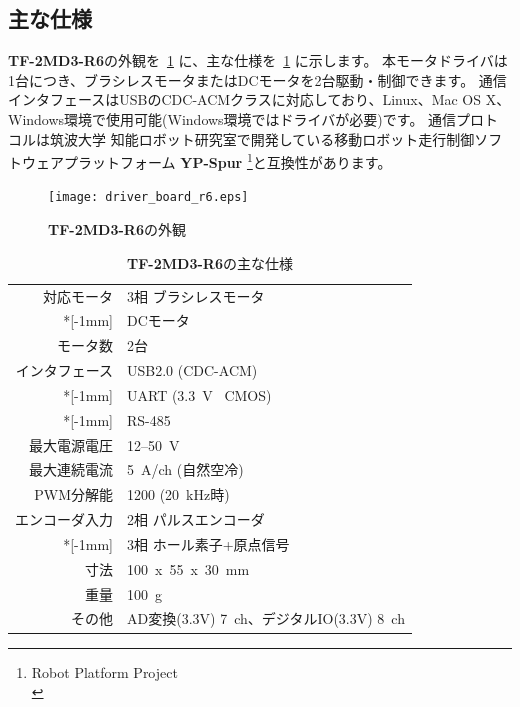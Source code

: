 \documentclass[11pt,a4j,openany,fleqn]{jbook}
\begin{document}
\newpage
\subsection{主な仕様}
\label{sec:主な仕様}

{\bf TF-2MD3-R6}の外観を\figurename~\ref{fig:driver_board_r6} に、主な仕様を\tablename~\ref{tb:tfrog_motor_driver} に示します。
本モータドライバは1台につき、ブラシレスモータまたはDCモータを2台駆動・制御できます。
通信インタフェースはUSBのCDC-ACMクラスに対応しており、Linux、Mac OS X、Windows環境で使用可能(Windows環境ではドライバが必要)です。
通信プロトコルは筑波大学 知能ロボット研究室で開発している移動ロボット走行制御ソフトウェアプラットフォーム {\bf YP-Spur} \footnote{Robot Platform Project \\ }と互換性があります。\par

\begin{figure}[H]
\centering\texttt{[image: driver\_board\_r6.eps]}
\caption{{\bf TF-2MD3-R6}の外観}
\label{fig:driver_board_r6}
\end{figure}

\begin{table}[H]
\caption{{\bf TF-2MD3-R6}の主な仕様}
\label{tb:tfrog_motor_driver}
\smallskip
\centering\begin{tabular}{rl}
\toprule
対応モータ			&	3相 ブラシレスモータ			\\*[-1mm]
					&	DCモータ						\\
モータ数			&	2台								\\
インタフェース		&	USB2.0 (CDC-ACM)				\\*[-1mm]
					&	UART (3.3~V \ CMOS)				\\*[-1mm]
					&	RS-485							\\
最大電源電圧		&	12--50~V						\\
最大連続電流		&	5~A/ch (自然空冷)				\\
PWM分解能			&	1200 (20~kHz時)					\\
エンコーダ入力		&	2相 パルスエンコーダ			\\*[-1mm]
					&	3相 ホール素子+原点信号			\\
寸法				&	100~x~55~x~30~mm				\\
重量				&	100~g							\\
その他				&	AD変換(3.3V) 7~ch、デジタルIO(3.3V) 8~ch	\\
\bottomrule
\end{tabular}
\end{table}
\end{document}
